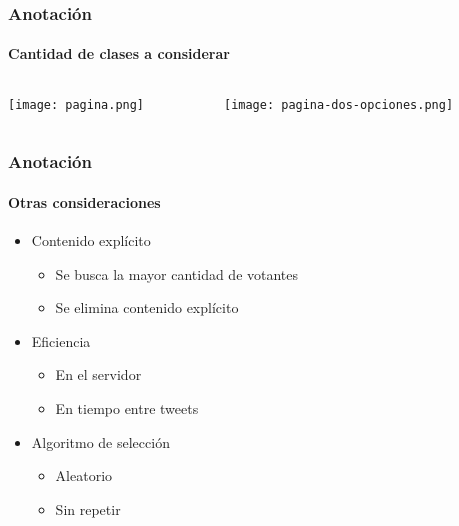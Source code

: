 \begin{frame}
\frametitle{Anotación}
\framesubtitle{Cantidad de clases a considerar}
        \begin{center}
        \begin{columns}[c]
            \begin{column}[c]{0.50\textwidth}
                \centering
                \texttt{[image: pagina.png]}
            \end{column}

            \begin{column}[c]{0.50\textwidth}
                \centering
                \texttt{[image: pagina-dos-opciones.png]}
            \end{column}
        \end{columns}
    \end{center}
\end{frame}
\begin{frame}
    \frametitle{Anotación}
    \framesubtitle{Otras consideraciones}

    \begin{itemize}
        \item Contenido explícito

        \begin{itemize}
            \item Se busca la mayor cantidad de votantes
            \item Se elimina contenido explícito
        \end{itemize}

        \item Eficiencia

        \begin{itemize}
            \item En el servidor
            \item En tiempo entre tweets
        \end{itemize}

        \item Algoritmo de selección

        \begin{itemize}
            \item Aleatorio
            \item Sin repetir
        \end{itemize}
    \end{itemize}
\end{frame}
